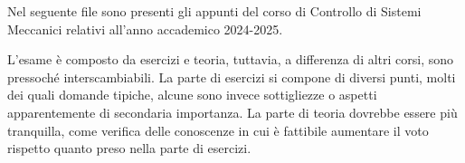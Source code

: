 Nel seguente file sono presenti gli appunti del corso di Controllo di Sistemi Meccanici relativi all'anno accademico 2024-2025.

L'esame è composto da esercizi e teoria, tuttavia, a differenza di altri corsi, sono pressoché interscambiabili.
La parte di esercizi si compone di diversi punti, molti dei quali domande tipiche, alcune sono invece sottigliezze o aspetti apparentemente di secondaria importanza.
La parte di teoria dovrebbe essere più tranquilla, come verifica delle conoscenze in cui è fattibile aumentare il voto rispetto quanto preso nella parte di esercizi.